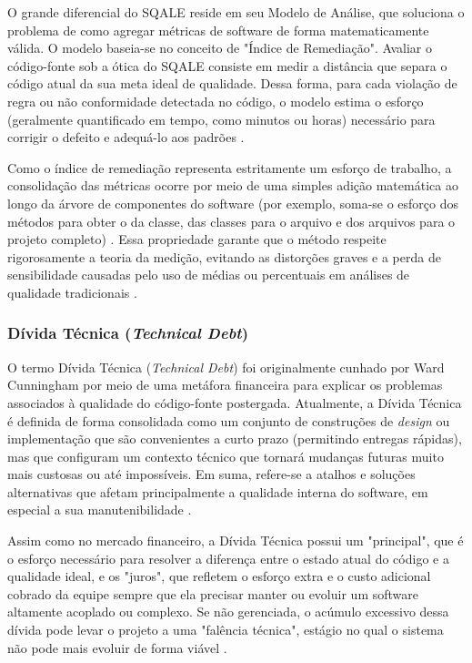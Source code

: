 O grande diferencial do SQALE reside em seu Modelo de Análise, que soluciona o problema de como agregar métricas de software de forma matematicamente válida. O modelo baseia-se no conceito de "Índice de Remediação". Avaliar o código-fonte sob a ótica do SQALE consiste em medir a distância que separa o código atual da sua meta ideal de qualidade. Dessa forma, para cada violação de regra ou não conformidade detectada no código, o modelo estima o esforço (geralmente quantificado em tempo, como minutos ou horas) necessário para corrigir o defeito e adequá-lo aos padrões \cite{letouzey2010}.

Como o índice de remediação representa estritamente um esforço de trabalho, a consolidação das métricas ocorre por meio de uma simples adição matemática ao longo da árvore de componentes do software (por exemplo, soma-se o esforço dos métodos para obter o da classe, das classes para o arquivo e dos arquivos para o projeto completo) \cite{letouzey2010}. Essa propriedade garante que o método respeite rigorosamente a teoria da medição, evitando as distorções graves e a perda de sensibilidade causadas pelo uso de médias ou percentuais em análises de qualidade tradicionais \cite{letouzey2010}.

\subsubsection{Dívida Técnica (\textit{Technical Debt})}

O termo Dívida Técnica (\textit{Technical Debt}) foi originalmente cunhado por Ward Cunningham por meio de uma metáfora financeira para explicar os problemas associados à qualidade do código-fonte postergada. Atualmente, a Dívida Técnica é definida de forma consolidada como um conjunto de construções de \textit{design} ou implementação que são convenientes a curto prazo (permitindo entregas rápidas), mas que configuram um contexto técnico que tornará mudanças futuras muito mais custosas ou até impossíveis. Em suma, refere-se a atalhos e soluções alternativas que afetam principalmente a qualidade interna do software, em especial a sua manutenibilidade \cite{silva2018}.

Assim como no mercado financeiro, a Dívida Técnica possui um "principal", que é o esforço necessário para resolver a diferença entre o estado atual do código e a qualidade ideal, e os "juros", que refletem o esforço extra e o custo adicional cobrado da equipe sempre que ela precisar manter ou evoluir um software altamente acoplado ou complexo. Se não gerenciada, o acúmulo excessivo dessa dívida pode levar o projeto a uma "falência técnica", estágio no qual o sistema não pode mais evoluir de forma viável \cite{silva2018}.

